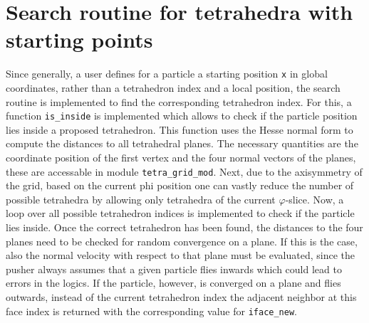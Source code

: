 \documentclass[./main.tex]{subfiles}
\begin{document}
\section{Search routine for tetrahedra with starting points}
Since generally, a user defines for a particle a starting position \texttt{x} in global coordinates, rather than a tetrahedron index and a local position, the search routine  is implemented to find the corresponding tetrahedron index. For this, a function \texttt{is\_inside} is implemented which allows to check if the particle position lies inside a proposed tetrahedron. This function uses the Hesse normal form to compute the distances to all tetrahedral planes. The necessary quantities are the coordinate position of the first vertex and the four normal vectors of the planes, these are accessable in module \texttt{tetra\_grid\_mod}. Next, due to the axisymmetry of the grid, based on the current phi position one can vastly reduce the number of possible tetrahedra by allowing only tetrahedra of the current $\varphi$-slice. Now, a loop over all possible tetrahedron indices is implemented to check if the particle lies inside. Once the correct tetrahedron has been found, the distances to the four planes need to be checked for random convergence on a plane. If this is the case, also the normal velocity with respect to that plane must be evaluated, since the pusher always assumes that a given particle flies inwards which could lead to errors in the logics. If the particle, however, is converged on a plane and flies outwards, instead of the current tetrahedron index the adjacent neighbor at this face index is returned with the corresponding value for \texttt{iface\_new}. 
\end{document}
